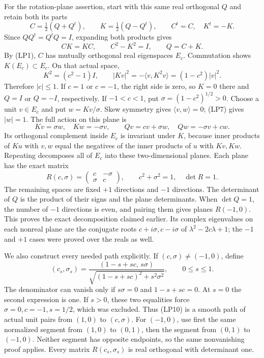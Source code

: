\documentclass[
  11pt,
]{article}
\begin{document}
For the rotation-plane assertion, start with this same real orthogonal
\(Q\) and retain both its parts \[
 C=\tfrac12(Q+Q^t),\qquad K=\tfrac12(Q-Q^t),
 \qquad C^t=C,\quad K^t=-K.
 \tag{LP5}
\] Since \(QQ^t=Q^tQ=I\), expanding both products gives \[
 CK=KC,\qquad C^2-K^2=I,
 \qquad Q=C+K.
 \tag{LP6}
\] By (LP1), \(C\) has mutually orthogonal real eigenspaces \(E_c\).
Commutation shows \(K(E_c)\subset E_c\). On that actual space, \[
 K^2=(c^2-1)I,
 \qquad |Kv|^2=-\langle v,K^2v\rangle=(1-c^2)|v|^2.
 \tag{LP7}
\] Therefore \(|c|\le1\). If \(c=1\) or \(c=-1\), the right side is
zero, so \(K=0\) there and \(Q=I\) or \(Q=-I\), respectively. If
\(-1<c<1\), put \(\sigma=(1-c^2)^{1/2}>0\). Choose a unit \(v\in E_c\)
and put \(w=Kv/\sigma\). Skew symmetry gives \(\langle v,w\rangle=0\);
(LP7) gives \(|w|=1\). The full action on this plane is \[
 Kv=\sigma w,\quad Kw=-\sigma v,
 \qquad
 Qv=cv+\sigma w,\quad Qw=-\sigma v+cw.
 \tag{LP8}
\] Its orthogonal complement inside \(E_c\) is invariant under \(K\),
because inner products of \(Ku\) with \(v,w\) equal the negatives of the
inner products of \(u\) with \(Kv,Kw\). Repeating decomposes all of
\(E_c\) into these two-dimensional planes. Each plane has the exact
matrix \[
 R(c,\sigma)=\begin{pmatrix}c&-\sigma\\\sigma&c\end{pmatrix},
 \qquad c^2+\sigma^2=1,\quad\det R=1.
 \tag{LP9}
\] The remaining spaces are fixed \(+1\) directions and \(-1\)
directions. The determinant of \(Q\) is the product of their signs and
the plane determinants. When \(\det Q=1\), the number of \(-1\)
directions is even, and pairing them gives planes \(R(-1,0)\). This
proves the exact decomposition claimed earlier. Its complex eigenvalues
on each nonreal plane are the conjugate roots \(c+i\sigma,c-i\sigma\) of
\(\lambda^2-2c\lambda+1\); the \(-1\) and \(+1\) cases were proved over
the reals as well.

We also construct every needed path explicitly. If
\((c,\sigma)\ne(-1,0)\), define \[
 (c_s,\sigma_s)=
 \frac{(1-s+sc,\,s\sigma)}
      {\sqrt{(1-s+sc)^2+s^2\sigma^2}},\qquad 0\le s\le1.
 \tag{LP10}
\] The denominator can vanish only if \(s\sigma=0\) and \(1-s+sc=0\). At
\(s=0\) the second expression is one. If \(s>0\), these two equalities
force \(\sigma=0,c=-1,s=1/2\), which was excluded. Thus (LP10) is a
smooth path of actual unit pairs from \((1,0)\) to \((c,\sigma)\). For
\((-1,0)\), use first the same normalized segment from \((1,0)\) to
\((0,1)\), then the segment from \((0,1)\) to \((-1,0)\). Neither
segment has opposite endpoints, so the same nonvanishing proof applies.
Every matrix \(R(c_s,\sigma_s)\) is real orthogonal with determinant
one.
\end{document}
